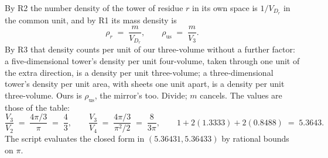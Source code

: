 By R2 the number density of the tower of residue $r$ in its own space is $1/V_{D_{r}}$ in the common unit, and by R1 its mass density is
\[
\rho_{r} \;=\; \frac{m}{V_{D_{r}}}, \qquad \rho_{\mathrm{us}} \;=\; \frac{m}{V_{3}}.
\]
By R3 that density counts per unit of our three-volume without a further factor: a five-dimensional tower's density per unit four-volume, taken through one unit of the extra direction, is a density per unit three-volume; a three-dimensional tower's density per unit area, with sheets one unit apart, is a density per unit three-volume. Ours is $\rho_{\mathrm{us}}$, the mirror's too. Divide; $m$ cancels. The values are those of the table:
\[
\frac{V_{3}}{V_{2}} \;=\; \frac{4\pi/3}{\pi} \;=\; \frac{4}{3}, \qquad
\frac{V_{3}}{V_{4}} \;=\; \frac{4\pi/3}{\pi^{2}/2} \;=\; \frac{8}{3\pi}, \qquad
1 + 2(1.3333) + 2(0.8488) \;=\; 5.3643 .
\]
The script evaluates the closed form in $(5.36431, 5.36433)$ by rational bounds on $\pi$.
